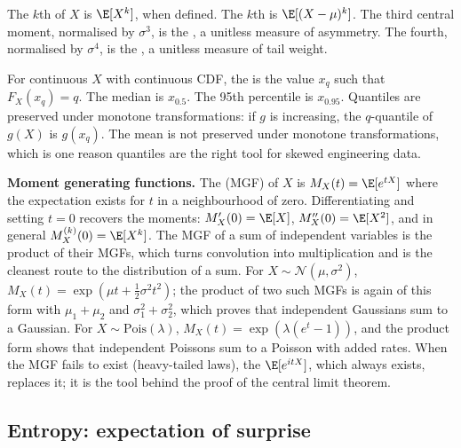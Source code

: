 The $k$th  of $X$ is $\E[X^{k}]$, when defined. The
$k$th  is $\E[(X - \mu)^{k}]$. The third
central moment, normalised by $\sigma^{3}$, is the ,
a unitless measure of asymmetry. The fourth, normalised by
$\sigma^{4}$, is the , a unitless measure of tail
weight.

For continuous $X$ with continuous CDF, the 
is the value $x_{q}$ such that $F_{X}(x_{q}) = q$. The median is
$x_{0.5}$. The 95th percentile is $x_{0.95}$. Quantiles are
preserved under monotone transformations: if $g$ is increasing,
the $q$-quantile of $g(X)$ is $g(x_{q})$. The mean is not preserved
under monotone transformations, which is one reason quantiles are
the right tool for skewed engineering data.

\begin{mastery}
\textbf{Moment generating functions.} The  (MGF) of $X$ is $M_{X}(t) = \E[e^{tX}]$ where
the expectation exists for $t$ in a neighbourhood of zero.
Differentiating and setting $t = 0$ recovers the moments:
$M_{X}'(0) = \E[X]$, $M_{X}''(0) = \E[X^{2}]$, and in general
$M_{X}^{(k)}(0) = \E[X^{k}]$. The MGF of a sum of independent
variables is the product of their MGFs, which turns convolution
into multiplication and is the cleanest route to the distribution
of a sum. For $X \sim \mathcal{N}(\mu, \sigma^{2})$,
$M_{X}(t) = \exp(\mu t + \tfrac{1}{2}\sigma^{2} t^{2})$; the product
of two such MGFs is again of this form with $\mu_{1} + \mu_{2}$ and
$\sigma_{1}^{2} + \sigma_{2}^{2}$, which proves that independent
Gaussians sum to a Gaussian. For $X \sim \mathrm{Pois}(\lambda)$,
$M_{X}(t) = \exp(\lambda(e^{t} - 1))$, and the product form shows
that independent Poissons sum to a Poisson with added rates. When
the MGF fails to exist (heavy-tailed laws), the
 $\E[e^{itX}]$, which always
exists, replaces it; it is the tool behind the proof of the central
limit theorem.
\end{mastery}

\subsection{Entropy: expectation of surprise}

